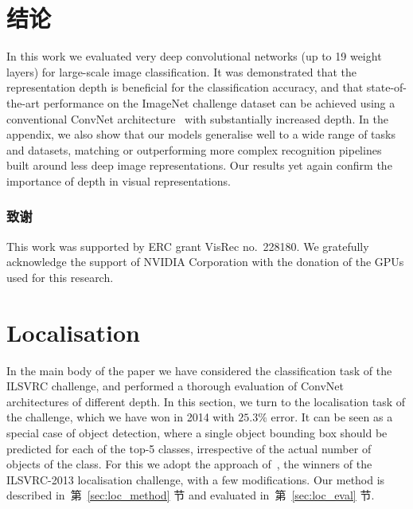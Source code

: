 \documentclass{article} %
\newcommand{\sref}[1]{第~\ref{#1} 节}
\begin{document}

\section{结论}
\label{sec:conclusion}
In this work we evaluated very deep convolutional networks (up to 19 weight layers) for large-scale image classification.
It was demonstrated that the representation depth is beneficial for the classification accuracy, and that 
state-of-the-art performance on the ImageNet challenge dataset can be achieved using a conventional ConvNet architecture~\citep{LeCun89,Krizhevsky12}
with substantially increased depth. 
In the appendix, we also show that our models generalise well to a wide range of tasks and datasets, matching or outperforming more complex recognition pipelines built around less deep image representations.
Our results yet again confirm the importance of depth in visual representations.

\subsubsection*{致谢}
This work was supported by ERC grant VisRec no.\ 228180. 
We gratefully acknowledge the support of NVIDIA Corporation with the donation of the GPUs used for this research.


{
    \small
    \setlength{\bibsep}{3pt}
    
}

\appendix

\section{Localisation}
\label{sec:loc}
In the main body of the paper we have considered the classification task of the ILSVRC challenge, and performed a thorough evaluation of ConvNet architectures of different depth.
In this section, we turn to the localisation task of the challenge, which we have won in 2014 with $25.3\%$ error.
It can be seen as a special case of object detection, where a single object bounding box should be predicted for each of the top-5 classes, irrespective of the actual number of objects of the class.
For this we adopt the approach of~\citet{Sermanet14}, the winners of the ILSVRC-2013 localisation challenge, with a few modifications.
Our method is described in~\sref{sec:loc_method} and evaluated in~\sref{sec:loc_eval}.
\end{document}
